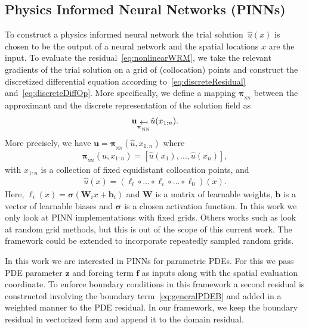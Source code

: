 \documentclass[11pt, fleqn]{article}
\def\z{{\mathbf z}}
\def\fbf{{\mathbf f}}
\def\ubf{{\mathbf u}}
\def\bpi{{\boldsymbol \pi}}
\def\bpi{{\boldsymbol \pi}}
\def \bpiNN{{\bpi_{_\text{NN}}}}
\begin{document}
\subsection{Physics Informed Neural Networks (PINNs)}
%
To construct a physics informed neural network the trial solution~$\hat u(x)$ is chosen to be the output of a neural network and the spatial locations $x$ are the input. To evaluate the residual~\eqref{eq:nonlinearWRM}, we take the relevant gradients of the trial solution on a grid of (collocation) points and construct the discretized differential equation according to~\eqref{eq:discreteResidual} and~\eqref{eq:discreteDiffOp}. More specifically, we define a mapping $\bpiNN$ between the approximant and the discrete representation of the solution field as
\begin{align}
    \ubf\underset{\bpiNN}{\,\text{\rotatebox[origin=c]{180}{$\mapsto$}}\,}\hat{u}(x_{1:n}).
\end{align}
More precisely, we have $\ubf = \bpiNN(\hat{u}, x_{1:n})$ where
\begin{align*}
    \bpiNN(\hat{u},
x_{1:n}) = [\hat{u}(x_1), \ldots, \hat{u}(x_n)],
\end{align*}
with $x_{1:n}$ is a collection of fixed equidistant collocation points, and 
\begin{align}
     \hat{u}(x) = (\ell_l \circ \hdots \circ \ell_i\circ \hdots \circ \ell_0)(x).
\end{align}
Here, $\ell_i(x) = \boldsymbol{\sigma}(\mathbf{W}_i x+\mathbf{b}_i)$ and $\mathbf{W}$ is a matrix of learnable weights, $\mathbf{b}$ is a vector of learnable biases and $ \boldsymbol{\sigma}$ is a chosen activation function. In this work we only look at PINN implementations with fixed grids. Others works such as \cite{chiu2022can} look at random grid methods, but this is out of the scope of this current work. The framework could be extended to incorporate repeatedly sampled random grids.

In this work we are interested in PINNs for parametric PDEs. For this we pass PDE parameter $\z$ and forcing term $\fbf$ as inputs along with the spatial evaluation coordinate. 
To enforce boundary conditions in this framework a second residual is constructed involving the boundary term~\eqref{eq:generalPDEB} and added in a weighted manner to the PDE residual. In our framework, we keep the boundary residual in vectorized form and append it to the domain residual.
\end{document}
